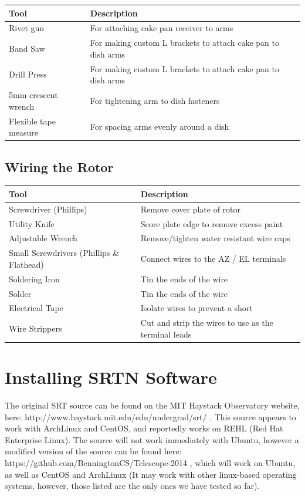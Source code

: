 \documentclass[11pt]{article} %
\begin{document}
\begin{tabular}{| l | p{10cm} |}
\hline
\textbf{Tool} & \textbf{Description} \\ \hline \hline
Rivet gun & For attaching cake pan receiver to arms \\ \hline
Band Saw & For making custom L brackets to attach cake pan to dish arms \\ \hline
Drill Press & For making custom L brackets to attach cake pan to dish arms \\ \hline
5mm crescent wrench & For tightening arm to dish fasteners \\ \hline
Flexible tape measure & For spacing arms evenly around a dish \\ \hline
\end{tabular}


\subsection{Wiring the Rotor}

\begin{tabular}{| l | l |}
\hline
\textbf{Tool} & \textbf{Description} \\ \hline \hline
Screwdriver (Phillips) & Remove cover plate of rotor \\ \hline
Utility Knife & Score plate edge to remove excess paint \\ \hline
Adjustable Wrench & Remove/tighten water resistant wire caps \\ \hline
Small Screwdrivers (Phillips \& Flathead) & Connect wires to the AZ / EL terminals \\ \hline
Soldering Iron & Tin the ends of the wire \\ \hline
Solder & Tin the ends of the wire \\ \hline
Electrical Tape & Isolate wires to prevent a short \\ \hline
Wire Strippers & Cut and strip the wires to use as the terminal leads \\ \hline
\end{tabular}


\newpage
\section{Installing SRTN Software}

The original SRT source can be found on the MIT Haystack Observatory website, here: http://www.haystack.mit.edu/edu/undergrad/srt/ . This source appears to work with ArchLinux and CentOS, and reportedly works on REHL (Red Hat Enterprise Linux). The source will not work immediately with Ubuntu, however a modified version of the source can be found here: https://github.com/BenningtonCS/Telescope-2014 , which will work on Ubuntu, as well as CentOS and ArchLinux (It may work with other linux-based operating systems, however, those listed are the only ones we have tested so far). 
\end{document}
